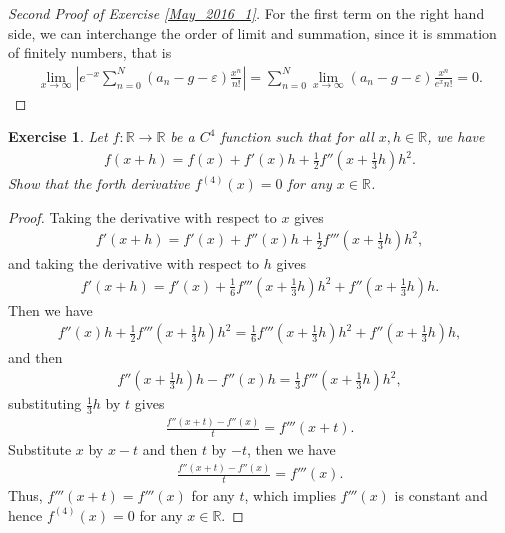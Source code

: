 \documentclass[11pt]{article}
\newtheorem{exercise}{Exercise}[section]
\theoremstyle{definition}
\numberwithin{equation}{subsection}
\begin{document}
\medskip

\begin{proof}[Second Proof of Exercise \ref{May_2016_1}]
For the first term on the right hand side, we can interchange the order of limit and summation, since it is smmation of finitely numbers, that is
\begin{align*}
    \lim_{x\to\infty} \left|e^{-x}\sum_{n=0}^N (a_n - g - \varepsilon) \frac{x^n}{n!} \right| = \sum_{n=0}^N \lim_{x\to\infty} (a_n - g - \varepsilon) \frac{x^n}{e^x n!} = 0.
\end{align*}
\end{proof}

\medskip

\begin{exercise}{\rm *}
Let $f: \mathbb{R} \to \mathbb{R}$ be a $C^4$ function such that for all $x, h \in \mathbb{R}$, we have
\begin{align*}
    f(x + h) = f(x) + f'(x)h + \frac{1}{2} f''\left(x + \frac{1}{3}h \right)h^2.
\end{align*}
Show that the forth derivative $f^{(4)}(x) = 0$ for any $x \in \mathbb{R}$.
\end{exercise}
\begin{proof}
Taking the derivative with respect to $x$ gives
\begin{align*}
    f'(x + h) = f'(x) + f''(x)h + \frac{1}{2} f'''\left(x + \frac{1}{3}h \right)h^2,
\end{align*}
and taking the derivative with respect to $h$ gives
\begin{align*}
    f'(x + h) = f'(x) + \frac{1}{6} f'''\left(x + \frac{1}{3}h \right)h^2 + f''\left(x + \frac{1}{3}h \right)h.
\end{align*}
Then we have
\begin{align*}
    f''(x)h + \frac{1}{2} f'''\left(x + \frac{1}{3}h \right)h^2 = \frac{1}{6} f'''\left(x + \frac{1}{3}h \right)h^2 + f''\left(x + \frac{1}{3}h \right)h,
\end{align*}
and then
\begin{align*}
    f''\left(x + \frac{1}{3}h \right)h - f''(x)h = \frac{1}{3} f'''\left(x + \frac{1}{3}h \right)h^2,
\end{align*}
substituting $\frac{1}{3}h$ by $t$ gives
\begin{align*}
    \frac{f''(x + t) - f''(x)}{t} = f'''(x + t).
\end{align*}
Substitute $x$ by $x - t$ and then $t$ by $-t$, then we have
\begin{align*}
    \frac{f''(x + t) - f''(x)}{t} = f'''(x).
\end{align*}
Thus, $f'''(x + t) = f'''(x)$ for any $t$, which implies $f'''(x)$ is constant and hence $f^{(4)}(x) = 0$ for any $x \in \mathbb{R}$.
\end{proof}
\end{document}
